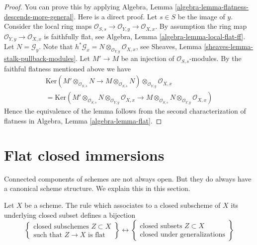 \begin{proof}
You can prove this by applying
Algebra, Lemma \ref{algebra-lemma-flatness-descends-more-general}.
Here is a direct proof. Let $s \in S$ be the image of $y$.
Consider the local ring maps
$\mathcal{O}_{S, s} \to \mathcal{O}_{Y, y} \to \mathcal{O}_{X, x}$.
By assumption the ring map $\mathcal{O}_{Y, y} \to \mathcal{O}_{X, x}$
is faithfully flat, see
Algebra, Lemma \ref{algebra-lemma-local-flat-ff}.
Let $N = \mathcal{G}_y$. Note that
$h^*\mathcal{G}_x = N \otimes_{\mathcal{O}_{Y, y}} \mathcal{O}_{X, x}$, see
Sheaves, Lemma \ref{sheaves-lemma-stalk-pullback-modules}.
Let $M' \to M$ be an injection of $\mathcal{O}_{S, s}$-modules.
By the faithful flatness mentioned above we have
\begin{align*}
\text{Ker}(
M' \otimes_{\mathcal{O}_{S, s}} N \to M \otimes_{\mathcal{O}_{S, s}} N)
\otimes_{\mathcal{O}_{Y, y}} \mathcal{O}_{X, x} \\
=
\text{Ker}(
M' \otimes_{\mathcal{O}_{S, s}} N
\otimes_{\mathcal{O}_{Y, y}} \mathcal{O}_{X, x}
\to
M \otimes_{\mathcal{O}_{S, s}} N
\otimes_{\mathcal{O}_{Y, y}} \mathcal{O}_{X, x})
\end{align*}
Hence the equivalence of the lemma follows from the second characterization
of flatness in
Algebra, Lemma \ref{algebra-lemma-flat}.
\end{proof}





\section{Flat closed immersions}
\label{section-flat-closed-immersions}

\noindent
Connected components of schemes are not always open. But they do always
have a canonical scheme structure. We explain this in this section.

\begin{lemma}
\label{lemma-characterize-flat-closed-immersions}
Let $X$ be a scheme. The rule which associates to a closed subscheme
of $X$ its underlying closed subset defines a bijection
$$
\left\{
\begin{matrix}
\text{closed subschemes }Z \subset X \\
\text{such that }Z \to X\text{ is flat}
\end{matrix}
\right\}
\leftrightarrow
\left\{
\begin{matrix}
\text{closed subsets }Z \subset X \\
\text{closed under generalizations}
\end{matrix}
\right\}
$$
\end{lemma}

